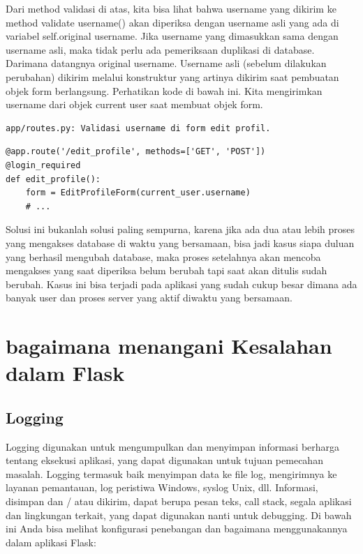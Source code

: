Dari method validasi di atas, kita bisa lihat bahwa username yang dikirim ke method validate username() akan diperiksa dengan username asli yang ada di variabel self.original username. Jika username yang dimasukkan sama dengan username asli, maka tidak perlu ada pemeriksaan duplikasi di database. Darimana datangnya original username.
Username asli (sebelum dilakukan perubahan) dikirim melalui konstruktur yang artinya dikirim saat pembuatan objek form berlangsung. Perhatikan kode di bawah ini. Kita mengirimkan username dari objek current user saat membuat objek form. 
\begin{verbatim}
app/routes.py: Validasi username di form edit profil.
\end{verbatim}

\begin{verbatim}
@app.route('/edit_profile', methods=['GET', 'POST'])
@login_required
def edit_profile():
    form = EditProfileForm(current_user.username)
    # ...
\end{verbatim}
Solusi ini bukanlah solusi paling sempurna, karena jika ada dua atau lebih proses yang mengakses database di waktu yang bersamaan, bisa jadi kasus siapa duluan yang berhasil mengubah database, maka proses setelahnya akan mencoba mengakses yang saat diperiksa belum berubah tapi saat akan ditulis sudah berubah. Kasus ini bisa terjadi pada aplikasi yang sudah cukup besar dimana ada banyak user dan proses server yang aktif diwaktu yang bersamaan.

\section{bagaimana menangani Kesalahan dalam Flask}
\subsection{Logging}
Logging digunakan untuk mengumpulkan dan menyimpan informasi berharga tentang eksekusi aplikasi, yang dapat digunakan untuk tujuan pemecahan masalah. Logging termasuk baik menyimpan data ke file log, mengirimnya ke layanan pemantauan, log peristiwa Windows, syslog Unix, dll. Informasi, disimpan dan / atau dikirim, dapat berupa pesan teks, call stack, segala aplikasi dan lingkungan terkait, yang dapat digunakan nanti untuk debugging.
Di bawah ini Anda bisa melihat konfigurasi penebangan dan bagaimana menggunakannya dalam aplikasi Flask:

